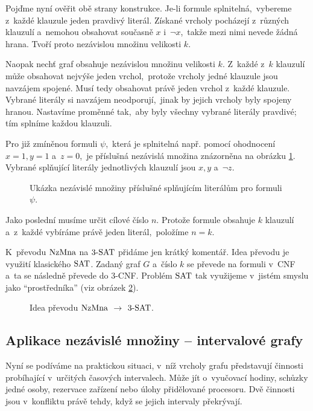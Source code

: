 Pojďme nyní ověřit obě strany konstrukce. Je-li formule splnitelná,~vybereme z~každé klauzule jeden pravdivý literál. Získané vrcholy pocházejí z~různých klauzulí a~nemohou obsahovat současně $x$ i~$\neg x$,~takže mezi nimi nevede žádná hrana. Tvoří proto nezávislou množinu velikosti $k$.

Naopak nechť graf obsahuje nezávislou množinu velikosti $k$. Z~každé z~$k$ klauzulí může obsahovat nejvýše jeden vrchol,~protože vrcholy jedné klauzule jsou navzájem spojené. Musí tedy obsahovat právě jeden vrchol z~každé klauzule. Vybrané literály si navzájem neodporují,~jinak by jejich vrcholy byly spojeny hranou. Nastavíme proměnné tak,~aby byly všechny vybrané literály pravdivé; tím splníme každou klauzuli.

Pro již zmíněnou formuli $\psi$,~která je splnitelná např. pomocí ohodnocení $x=1,y=1$ a~$z=0$,~je příslušná nezávislá množina znázorněna na obrázku \ref{fig:prevod_3sat_nzmna_2}. Vybrané splňující literály jednotlivých klauzulí jsou $x,y$ a~$\neg z$.
\begin{figure}[ht]
    \centering
    
    \caption{Ukázka nezávislé množiny příslušné splňujícím literálům pro formuli $\psi$.}
    \label{fig:prevod_3sat_nzmna_2}
\end{figure}

Jako poslední musíme určit cílové číslo $n$. Protože formule obsahuje $k$ klauzulí a~z~každé vybíráme právě jeden literál,~položíme $n=k$.

K~převodu \ensuremath{\NZMNA} na \ensuremath{\THREESAT} přidáme jen krátký komentář. Idea převodu je využití klasického \ensuremath{\SAT}. Zadaný graf $G$ a~číslo $k$ se převede na formuli v~CNF a~ta se následně převede do $3$-CNF. Problém \ensuremath{\SAT} tak využijeme v~jistém smyslu jako ``prostředníka'' (viz obrázek \ref{fig:prevod_nzmna_3sat}).
\begin{figure}[ht]
    \centering
    
    \caption{Idea převodu \ensuremath{\NZMNA} $\rightarrow$ \ensuremath{\THREESAT}.}
    \label{fig:prevod_nzmna_3sat}
\end{figure}

\subsection{Aplikace nezávislé množiny -- intervalové grafy}\label{subsec:int_graf}

Nyní se podíváme na praktickou situaci, v~níž vrcholy grafu představují činnosti probíhající v~určitých časových intervalech. Může jít o~vyučovací hodiny, schůzky jedné osoby, rezervace zařízení nebo úlohy přidělované procesoru. Dvě činnosti jsou v~konfliktu právě tehdy, když se jejich intervaly překrývají.

